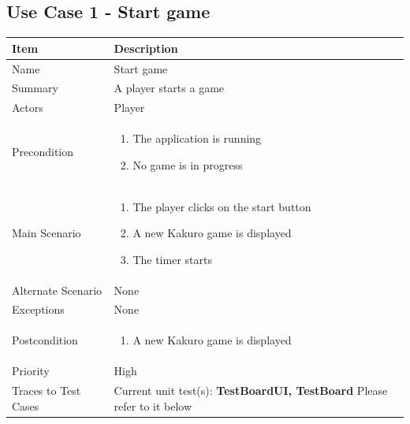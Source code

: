 \documentclass[12pt]{article}
\begin{document}
\newpage


\subsection{Use Case 1 - Start game} 

\begin{center}
\setlength{\tabcolsep}{18pt}
\renewcommand{\arraystretch}{1.1}
\begin{tabular}{ |p{3.4cm}|p{10cm}| }
    \hline
    \textbf{Item} & \textbf{Description} \\
    \hline
    Name & Start game \\
    \hline
    Summary & A player starts a game \\
    \hline
    Actors & Player \\
    \hline
    Precondition &  
    \vspace*{-0.1in}
    \begin{enumerate}[leftmargin=0.2in]
    \item The application is running
    \item No game is in progress
    \end{enumerate}  \\
    \hline
    Main Scenario &     
    \vspace*{-0.1in}
    \begin{enumerate}[leftmargin=0.2in]
    \item The player clicks on the start button
    \item A new Kakuro game is displayed
    \item The timer starts
    \end{enumerate}  \\
    \hline
    Alternate Scenario & None  \\
    \hline
    Exceptions & None \\
    \hline
    Postcondition & 
    \vspace*{-0.1in}
    \begin{enumerate}[leftmargin=0.2in]
    \item A new Kakuro game is displayed 
    \end{enumerate}  \\
    \hline
    Priority & High  \\
    \hline
    \small{Traces to Test Cases} & 
    Current unit test(s): \textbf{TestBoardUI, TestBoard} \newline
    Please refer to it below
    \\
    \hline
\end{tabular}
\end{center}
\end{document}
